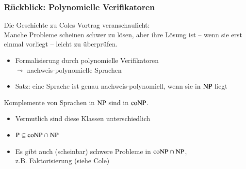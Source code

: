 \documentclass[aspectratio=1610,onlymath]{beamer}
\begin{document}
\begin{frame}\frametitle{Rückblick: Polynomielle Verifikatoren}

Die Geschichte zu Coles Vortrag veranschaulicht:\\
\alert{Manche Probleme scheinen schwer zu lösen, aber ihre Lösung ist -- wenn sie erst einmal vorliegt -- leicht zu überprüfen.}
\bigskip

\begin{itemize}
\item Formalisierung durch \alert{polynomielle Verifikatoren}\\$\leadsto$ nachweis-polynomielle Sprachen
\item Satz: eine Sprache ist genau nachweis-polynomiell, wenn sie in ${\textsc{NP}}$ liegt
\end{itemize}
\bigskip

Komplemente von Sprachen in ${\textsc{NP}}$ sind in ${\textsc{coNP}}$.
\begin{itemize}
\item Vermutlich sind diese Klassen unterschiedlich
\item ${\textsc{P}}\subseteq{\textsc{coNP}}\cap{\textsc{NP}}$
\item Es gibt auch (scheinbar) schwere Probleme in ${\textsc{coNP}}\cap{\textsc{NP}}$,\\
z.B. Faktorisierung (siehe Cole)
\end{itemize}

\end{frame}



\newcommand{\ppred}[1]{\color{myred}{\text{r}_{#1}}\color{text}{}}
\newcommand{\pgreen}[1]{\color{mygreen}{\text{g}_{#1}}\color{text}{}}
\newcommand{\pblue}[1]{\color{myblue}{\text{b}_{#1}}\color{text}{}}
\end{document}
